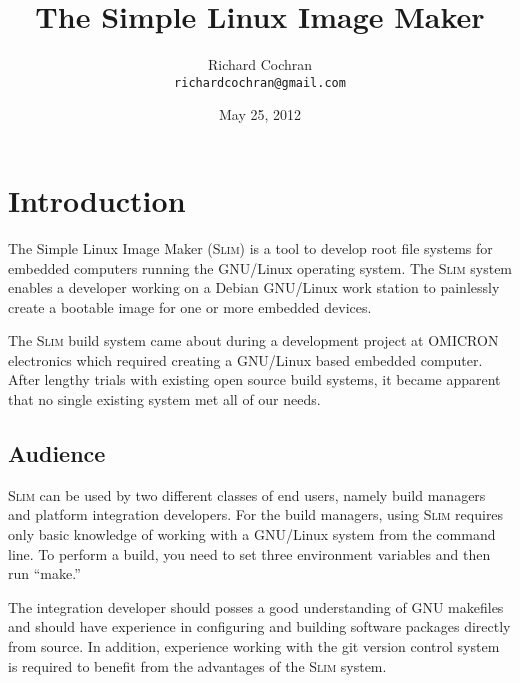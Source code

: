 \documentclass[a4paper,10pt]{article}
\newcommand{\slim}{\textsc{Slim}\xspace}
\begin{document}
\title{
  The Simple Linux Image Maker
}
\author{
  Richard Cochran \\
  {\tt richardcochran@gmail.com}
}
\date{May 25, 2012}
\maketitle
\newpage
\tableofcontents
\newpage

\setlength{\parindent}{0pt}
\setlength{\parskip}{\baselineskip}

\section{Introduction}

    The Simple Linux Image Maker (\slim) is a tool to develop root
    file systems for embedded computers running the GNU/Linux
    operating system. The \slim system enables a developer working on
    a Debian GNU/Linux work station to painlessly create a bootable
    image for one or more embedded devices.

    The \slim build system came about during a development project at
    OMICRON electronics which required creating a GNU/Linux based
    embedded computer. After lengthy trials with existing open source
    build systems, it became apparent that no single existing system
    met all of our needs.

\subsection{Audience}

    \slim can be used by two different classes of end users, namely
    build managers and platform integration developers. For the build
    managers, using \slim requires only basic knowledge of working
    with a GNU/Linux system from the command line. To perform a build,
    you need to set three environment variables and then run ``make.''

    The integration developer should posses a good understanding of
    GNU makefiles and should have experience in configuring and
    building software packages directly from source. In addition,
    experience working with the git version control system is required
    to benefit from the advantages of the \slim system.
\end{document}
